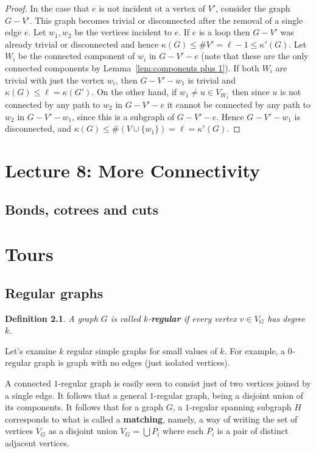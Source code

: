 \documentclass[12pt]{report}
\theoremstyle{plain}
\newtheorem{defn}[thm]{Definition}
\newcommand{\Xb}[1]{\textbf{#1}\index{#1}}
\begin{document}
\begin{proof}
In the case that $e$ is not incident ot a vertex of $V'$, consider the
graph $G - V'$. This graph becomes trivial or disconnected after the
removal of a single edge $e$. Let $w_1, w_2$ be the vertices incident to $e$.
If $e$ is a loop then $G - V'$ was already trivial or disconnected and
hence $\kappa(G) \leq \#V' = \ell - 1 \leq \kappa'(G)$. Let $W_i$ be the
connected component of $w_i$ in $G - V' - e$ (note that these are the only
connected components by Lemma~\ref{lem:components plus 1}). If both $W_i$
are trivial with just the vertex $w_i$, then $G - V' - w_1$ is trivial
and $\kappa(G) \leq \ell = \kappa(G')$. On the other hand, if $w_1 \neq u
\in V_{W_1}$ then since $u$ is not connected by any path to $w_2$ in $G -
V' - e$ it cannot be connected by any path to $w_2$ in $G - V' - w_1$,
since this is a subgraph of $G - V' - e$. Hence $G - V' - w_1$ is
disconnected, and $\kappa(G) \leq \#(V \cup \{w_1\}) = \ell = \kappa'(G)$.
\end{proof}

\chapter{Lecture 8: More Connectivity} \label{chap:more connectivity}
\section{Bonds, cotrees and cuts}

\chapter{Tours}
\section{Regular graphs}

\begin{defn}
A graph $G$ is called $k$-\Xb{regular} if every vertex $v \in V_G$ has
degree $k$.
\end{defn}

Let's examine $k$ regular simple graphs for small values of $k$. For example, a
$0$-regular graph is graph with no edges (just isolated vertices).

A connected $1$-regular graph is easily seen to consist just of two
vertices joined by a single edge. It follows that a general $1$-regular
graph, being a disjoint union of its components. It follows that for a
graph $G$, a $1$-regular spanning subgraph $H$ corresponds to what is
called a \Xb{matching}, namely, a way of writing the set of vertices $V_G$
as a disjoint union $V_G = \bigcup P_i$ where each $P_i$ is a pair of
distinct adjacent vertices. 
\end{document}

